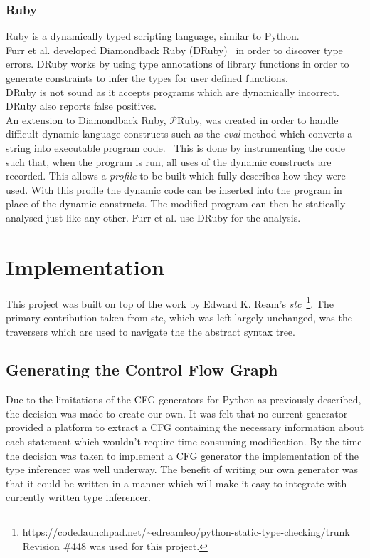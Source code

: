 \documentclass[12pt, titlepage]{article}
\begin{document}
\subsubsection{Ruby}
Ruby is a dynamically typed scripting language, similar to Python. \\
Furr et al. developed Diamondback Ruby (DRuby)~\cite{furr09} in order to discover type errors. DRuby works by using type annotations of library functions in order to generate constraints to infer the types for user defined functions. \\
DRuby is not sound as it accepts programs which are dynamically incorrect. DRuby also reports false positives. \\
An extension to Diamondback Ruby, $\mathcal{P}$Ruby, was created in order to handle difficult dynamic language constructs such as the \textit{eval} method which converts a string into executable program code.~\cite{pRuby} This is done by instrumenting the code such that, when the program is run, all uses of the dynamic constructs are recorded. This allows a \textit{profile} to be built which fully describes how they were used. With this profile the dynamic code can be inserted into the program in place of the dynamic constructs. The modified program can then be statically analysed just like any other. Furr et al. use DRuby for the analysis.

\newpage
\section{Implementation}
This project was built on top of the work by Edward K. Ream's \textit{stc}~\footnote{\url{https://code.launchpad.net/~edreamleo/python-static-type-checking/trunk} Revision \#448 was used for this project.}. The primary contribution taken from stc, which was left largely unchanged, was the traversers which are used to navigate the the abstract syntax tree.

\subsection{Generating the Control Flow Graph}
Due to the limitations of the CFG generators for Python as previously described, the decision was made to create our own. It was felt that no current generator provided a platform to extract a CFG containing the necessary information about each statement which wouldn't require time consuming modification. By the time the decision was taken to implement a CFG generator the implementation of the type inferencer was well underway. The benefit of writing our own generator was that it could be written in a manner which will make it easy to integrate with currently written type inferencer. \\
\end{document}
